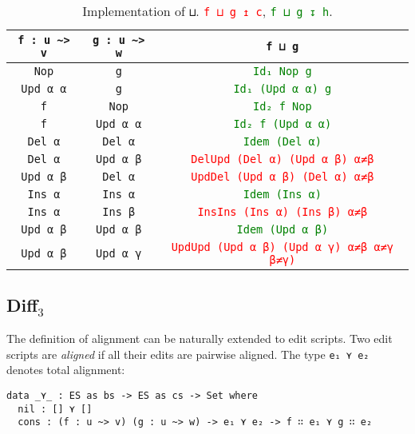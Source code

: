 \documentclass[../Thesis.tex]{subfiles}
\begin{document}
	\begin{table}[h]
	\centering
	\begin{tabular}{| c | c | c |}
	\hline
	\texttt{f : u \textasciitilde> v} & \texttt{g : u \textasciitilde> w} &  \texttt{f ⊔ g} 
	\\ \hline
	\texttt{Nop} & \texttt{g} & \textcolor{Green}{\texttt{Id₁ Nop g}} 
	\\ \hline
	\texttt{Upd α α} & \texttt{g} & \textcolor{Green}{\texttt{Id₁ (Upd α α) g}} 
	\\ \hline
	\texttt{f} & \texttt{Nop} & \textcolor{Green}{\texttt{Id₂ f Nop}} 
	\\ \hline
	\texttt{f} & \texttt{Upd α α} & \textcolor{Green}{\texttt{Id₂ f (Upd α α)}} 
	\\ \hline
	\texttt{Del α} & \texttt{Del α} & \textcolor{Green}{\texttt{Idem (Del α)}}
	\\ \hline
	\texttt{Del α} & \texttt{Upd α β} & \textcolor{Red}{\texttt{DelUpd (Del α) (Upd α β) α≠β}}
	\\ \hline
	\texttt{Upd α β} & \texttt{Del α} & \textcolor{Red}{\texttt{UpdDel (Upd α β) (Del α) α≠β}}
	\\ \hline
	\texttt{Ins α} & \texttt{Ins α} & \textcolor{Green}{\texttt{Idem (Ins α)}} 
	\\	\hline
	\texttt{Ins α} & \texttt{Ins β} & \textcolor{Red}{\texttt{InsIns (Ins α) (Ins β) α≠β}}
	\\	\hline
	\texttt{Upd α β} & \texttt{Upd α β} & \textcolor{Green}{\texttt{Idem (Upd α β)}}
	\\	\hline
	\texttt{Upd α β} & \texttt{Upd α γ} & \textcolor{Red}{\texttt{UpdUpd (Upd α β) (Upd α γ) α≠β α≠γ β≠γ)}}
	\\ \hline
	\end{tabular}
	\caption{Implementation of \texttt{⊔}. \textcolor{Red}{\texttt{f ⊔ g ↥ c}}, \textcolor{Green}{\texttt{f ⊔ g ↧ h}}.}
	\label{table:merge}
	\end{table}		

	\subsection{Diff$_3$}
	\label{subsec:Diff3}
	The definition of alignment can be naturally extended to edit scripts.
	Two edit scripts are \emph{aligned} if all their edits are pairwise aligned.	
	The type \texttt{e₁ ⋎ e₂} denotes total alignment:
	
\begin{verbatim}
data _⋎_ : ES as bs -> ES as cs -> Set where
  nil : [] ⋎ []
  cons : (f : u ~> v) (g : u ~> w) -> e₁ ⋎ e₂ -> f ∷ e₁ ⋎ g ∷ e₂ 
\end{verbatim}
\end{document}
